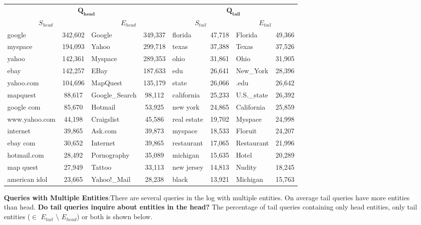 \documentclass[a0,portrait,final]{a0poster}
\newcommand{\tail}[1]{$\mathbf{Q_{tail}}${}}
\newcommand{\head}[1]{$\mathbf{Q_{head}}${}}
\newcommand{\stail}[1]{$S_{tail}${}}
\newcommand{\shead}[1]{$S_{head}${}}
\newcommand{\etail}[1]{$E_{tail}${}}
\newcommand{\ehead}[1]{$E_{head}${}}
\begin{document}
\begin{multicols}{2}
	\vspace{1cm}
\begin{center}
	{\small
\begin{tabular}{lc|lc|lc|lc}
\toprule
\multicolumn{4}{c}{\head{}} & \multicolumn{4}{c}{\tail{}}\\
\multicolumn{2}{c}{\shead{}} & \multicolumn{2}{c}{\ehead{}} & \multicolumn{2}{c}{\stail{}} & \multicolumn{2}{c}{\etail{}}\\
\midrule
google         & 342,602  &  Google  		   & 349,337  &  florida 	 &	47,718	&	Florida 		& 49,366 \\
myspace        & 194,093  &  Yahoo\!  		   & 299,718  &  texas  	 &	 37,388  &   Texas   		& 37,526 \\
yahoo          & 142,361  &  Myspace 		   & 289,353  &  ohio    	 &	31,861   &   Ohio    		& 31,905 \\			
ebay           & 142,257  &   EBay   		   & 187,633  &  edu     	 &	26,641   &   New\_York        & 28,396 \\
yahoo.com      & 104,696  &  MapQuest          & 135,179  &  state   	 &	26,066   &   .edu    		& 26,642 \\
mapquest       & 88,617   &  Google\_Search     & 98,112   &  california  &   25,233  &   U.S.\_state      & 26,392 \\
google com     & 85,670   &  Hotmail           & 53,925   &  new york    &   24,865  &   California      & 25,859 \\
www.yahoo.com  & 44,198   &  Craigslist        & 45,586   &  real estate &   19,702  &   Myspace 		& 24,998 \\
internet       & 39,865   &  Ask.com           & 39,873   &  myspace 	 &	18,533   &   Floruit 		& 24,207 \\
ebay com       & 30,652   &  Internet          & 39,865   &  restaurant  &  17,065   &   Restaurant      & 21,996 \\
hotmail.com    & 28,492   &  Pornography       & 35,089   &  michigan    &   15,635  &   Hotel   		& 20,289 \\
map quest      & 27,949   &  Tattoo            & 33,113   &  new jersey  &   14,813  &   Nudity  		& 18,245 \\
american idol  & 23,665   &  Yahoo!\_Mail       & 28,238   &  black   	 &	13,921   &   Michigan        & 15,763 \\
\bottomrule
\end{tabular}
}
\end{center}

\textbf{Queries with Multiple Entities}:There are several queries in the log with multiple entities. 
	On average tail queries have more entities than head. \textbf{Do tail queries inquire about entities in the head?} The percentage of 		tail queries containing only head entities, only tail entities ($\in$ \etail{} $\setminus$ \ehead{}) or both is shown below.
	

\end{multicols}
\end{document}
